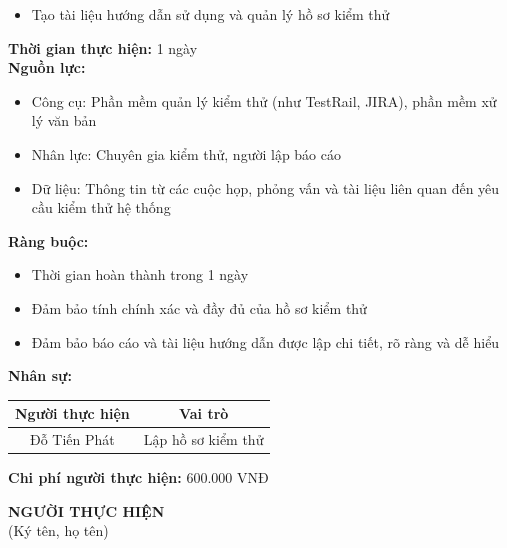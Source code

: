 {\begin{minipage}{\textwidth}
\begin{itemize}
        \item Tạo tài liệu hướng dẫn sử dụng và quản lý hồ sơ kiểm thử
    \end{itemize}
    \vspace{0.5cm}
    \noindent \textbf{Thời gian thực hiện:} 1 ngày \\
    \noindent \textbf{Nguồn lực:}
    \begin{itemize}
        \item Công cụ: Phần mềm quản lý kiểm thử (như TestRail, JIRA), phần mềm xử lý văn bản
        \item Nhân lực: Chuyên gia kiểm thử, người lập báo cáo
        \item Dữ liệu: Thông tin từ các cuộc họp, phỏng vấn và tài liệu liên quan đến yêu cầu kiểm thử hệ thống
    \end{itemize}
    \vspace{0.5cm}
    \noindent \textbf{Ràng buộc:}
    \begin{itemize}
        \item Thời gian hoàn thành trong 1 ngày
        \item Đảm bảo tính chính xác và đầy đủ của hồ sơ kiểm thử
        \item Đảm bảo báo cáo và tài liệu hướng dẫn được lập chi tiết, rõ ràng và dễ hiểu
    \end{itemize}
    \vspace{0.5cm}
    \noindent \textbf{Nhân sự:}
    \begin{longtable}{|c|c|}
    \hline
    \textbf{Người thực hiện} & \textbf{Vai trò} \\
    \hline
    Đỗ Tiến Phát & Lập hồ sơ kiểm thử \\
    \hline
    \end{longtable}
    \vspace{0.5cm}
    \noindent \textbf{Chi phí người thực hiện:} 600.000 VNĐ \\
    \vspace{1cm}
    \begin{flushleft}
        \hspace{8cm} \textbf{NGƯỜI THỰC HIỆN} \\
        \hspace{8.8cm} (Ký tên, họ tên) \\
        \vspace{1cm}
    \end{flushleft}
    \end{minipage}
}
% 
